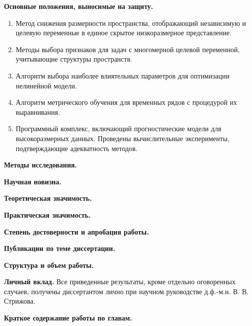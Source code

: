 \vspace{0.5cm}
\textbf{Основные положения, выносимые на защиту.}
\begin{enumerate}
	\item Метод снижения размерности пространства, отображающий независимую и целевую переменные в единое скрытое низкоразмерное представление.
	\item Методы выбора признаков для задач с многомерной целевой переменной, учитывающие структуры пространств.
	\item Алгоритм выбора наиболее влиятельных параметров для оптимизации нелинейной модели.
	\item Алгоритм метрического обучения для временных рядов с процедурой их выравнивания.
	\item Программный комплекс, включающий прогностические модели для высокоразмерных данных. Проведены вычислительные эксперименты, подтверждающие адекватность методов.
\end{enumerate}

\vspace{0.5cm}
\textbf{Методы исследования.}

\vspace{0.5cm}
\textbf{Научная новизна.}

\vspace{0.5cm}
\textbf{Теоретическая значимость.}

\vspace{0.5cm}
\textbf{Практическая значимость.}

\vspace{0.5cm}
\textbf{Степень достоверности и апробация работы.}

\vspace{0.5cm}
\textbf{Публикации по теме диссертации.}

\vspace{0.5cm}
\textbf{Структура и объем работы.}

\vspace{0.5cm}
\textbf{Личный вклад.}
Все приведенные результаты, кроме отдельно оговоренных случаев, получены диссертантом лично при научном руководстве д.ф.-м.н. В. В. Стрижова.

\vspace{0.5cm}
\textbf{Краткое содержание работы по главам.}